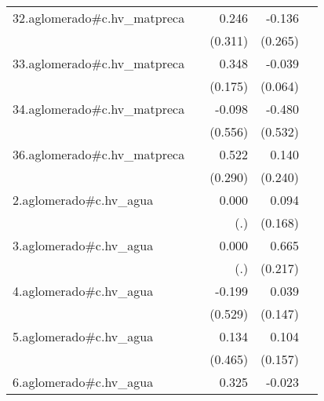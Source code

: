 {\begin{longtable}{l*{4}{D{.}{.}{-1}}}
\addlinespace
32.aglomerado#c.hv\_matpreca&                     &       0.246         &      -0.136         &                     \\
            &                     &     (0.311)         &     (0.265)         &                     \\
\addlinespace
33.aglomerado#c.hv\_matpreca&                     &       0.348\sym{*}  &      -0.039         &                     \\
            &                     &     (0.175)         &     (0.064)         &                     \\
\addlinespace
34.aglomerado#c.hv\_matpreca&                     &      -0.098         &      -0.480         &                     \\
            &                     &     (0.556)         &     (0.532)         &                     \\
\addlinespace
36.aglomerado#c.hv\_matpreca&                     &       0.522         &       0.140         &                     \\
            &                     &     (0.290)         &     (0.240)         &                     \\
\addlinespace
2.aglomerado#c.hv\_agua&                     &       0.000         &       0.094         &                     \\
            &                     &         (.)         &     (0.168)         &                     \\
\addlinespace
3.aglomerado#c.hv\_agua&                     &       0.000         &       0.665\sym{**} &                     \\
            &                     &         (.)         &     (0.217)         &                     \\
\addlinespace
4.aglomerado#c.hv\_agua&                     &      -0.199         &       0.039         &                     \\
            &                     &     (0.529)         &     (0.147)         &                     \\
\addlinespace
5.aglomerado#c.hv\_agua&                     &       0.134         &       0.104         &                     \\
            &                     &     (0.465)         &     (0.157)         &                     \\
\addlinespace
6.aglomerado#c.hv\_agua&                     &       0.325         &      -0.023         &                     \\

\end{longtable}}
